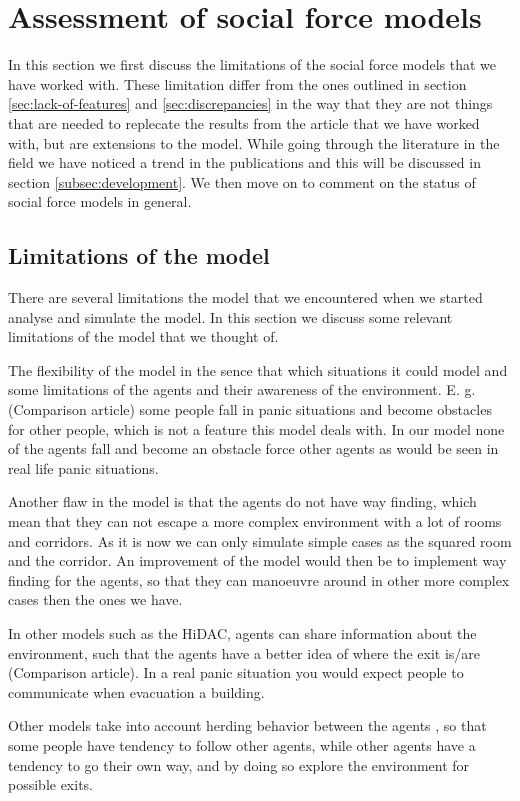 \section{Assessment of social force models}
\label{sec:assessment}
In this section we first discuss the limitations of the social force models 
that we have worked with. These limitation differ from the ones outlined in 
section \ref{sec:lack-of-features} and \ref{sec:discrepancies} in the way that 
they are not things that are needed to replecate the results from the article 
that we have worked with, but are extensions to the model. While going through 
the literature in the field we have noticed a trend in the publications and this 
will be discussed in section \ref{subsec:development}. We then move on to comment 
on the status of social force models in general.

\subsection{Limitations of the model}
There are several limitations the model that we encountered when we started 
analyse and simulate the model. In this section we discuss some relevant 
limitations of the model that we thought of.

The flexibility of the model in the sence that which situations it could model 
and some limitations of the agents and their awareness of the environment.
E. g. (Comparison article) some people fall in panic situations and become 
obstacles for other people, which is not a feature this model deals with. In 
our model none of the agents fall and become an obstacle force other agents as 
would be seen in real life panic situations.

Another flaw in the model is that the agents do not have way finding, which 
mean that they can not escape a more complex environment with a lot of rooms 
and corridors. As it is now we can only simulate simple cases as the squared 
room and the corridor.  An improvement of the model would then be to implement 
way finding for the agents, so that they can manoeuvre around in other more 
complex cases then the ones we have.

In other models such as the HiDAC, agents can share information about the 
environment, such that the agents have a better idea of where the exit is/are 
(Comparison article). In a real panic situation you would expect people to 
communicate when evacuation a building.

Other models take into account herding behavior between the agents  
\cite{helbing00}, so that some people have tendency to follow other agents, 
while other agents have a tendency to go their own way,  and by doing so 
explore the environment for possible exits.

